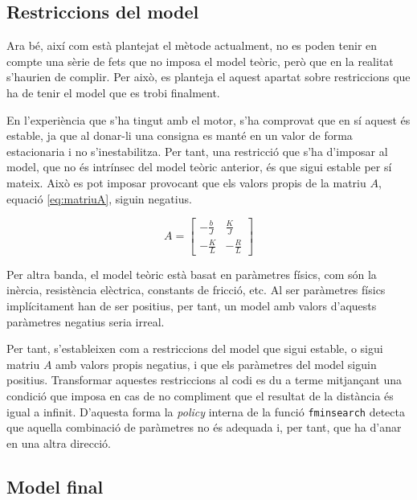 \documentclass[12pt,a4paper,final,twoside,openright]{report}
\begin{document}
\subsection{Restriccions del model}
Ara bé, així com està plantejat el mètode actualment, no es poden tenir en compte una sèrie de fets que no imposa el model teòric, però que en la realitat s'haurien de complir. Per això, es planteja el aquest apartat sobre restriccions que ha de tenir el model que es trobi finalment.

En l'experiència que s'ha tingut amb el motor, s'ha comprovat que en sí aquest és estable, ja que al donar-li una consigna es manté en un valor de forma estacionaria i no s'inestabilitza. Per tant, una restricció que s'ha d'imposar al model, que no és intrínsec del model teòric anterior, és que sigui estable per sí mateix. Això es pot imposar provocant que els valors propis de la matriu $A$, equació \eqref{eq:matriuA}, siguin negatius.

\begin{equation}\label{eq:matriuA}
A = \begin{bmatrix}
-\frac{b}{J} & \frac{K}{J}\\
-\frac{K}{L} & -\frac{R}{L}
\end{bmatrix}
\end{equation}

Per altra banda, el model teòric està basat en paràmetres físics, com són la inèrcia, resistència elèctrica, constants de fricció, etc. Al ser paràmetres físics implícitament han de ser positius, per tant, un model amb valors d'aquests paràmetres negatius seria irreal.

Per tant, s'estableixen com a restriccions del model que sigui estable, o sigui matriu $A$ amb valors propis negatius, i que els paràmetres del model siguin positius. Transformar aquestes restriccions al codi es du a terme mitjançant una condició que imposa en cas de no compliment que el resultat de la distància és igual a infinit. D'aquesta forma la \textit{policy} interna de la funció \texttt{fminsearch} detecta que aquella combinació de paràmetres no és adequada i, per tant, que ha d'anar en una altra direcció.

\subsection{Model final}
\end{document}
